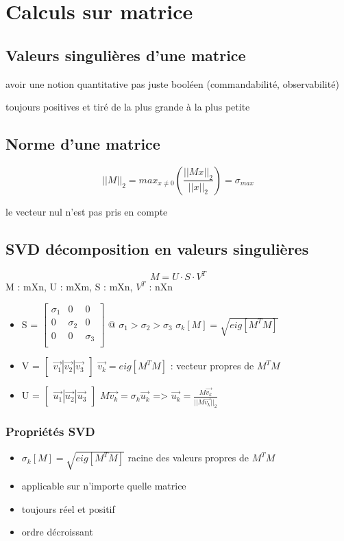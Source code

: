 \documentclass[resume]{subfiles}
\begin{document}
\section{Calculs sur matrice}

\subsection{Valeurs singulières d'une matrice}

avoir une notion quantitative pas juste booléen (commandabilité, observabilité)

toujours positives et tiré de la plus grande à la plus petite

\subsection{Norme d'une matrice}
$$||M||_2 = max_{x\neq0}(\frac{||Mx||_2}{||x||_2}) = \sigma_{max}$$

le vecteur nul n'est pas pris en compte

\subsection{SVD décomposition en valeurs singulières}
$$M = U\cdot S\cdot V^T$$
M : mXn, U : mXm, S : mXn, $V^T$ : nXn

\begin{itemize}
\item S = $\begin{bmatrix}\sigma_1 & 0& 0\\0&\sigma_2 & 0\\0&0&\sigma_3\\\end{bmatrix}$ @ $\sigma_1 > \sigma_2 > \sigma_3$ 
  \subitem $\sigma_k[M] = \sqrt{eig[M^TM]}$ 
\item V = $\begin{bmatrix}\vec{v_1}|\vec{v_2}|\vec{v_3}\end{bmatrix}$ 
  \subitem $\vec{v_k}= eig[M^TM]$ : vecteur propres de $M^T M$ 
\item U = $\begin{bmatrix}\vec{u_1}|\vec{u_2}|\vec{u_3}\end{bmatrix}$ 
  \subitem $M\vec{v_k} = \sigma_k\vec{u_k}$ => $\vec{u_k}=\frac{M\vec{v_k}}{||M\vec{v_k}||_2}$  
\end{itemize}

\subsubsection{Propriétés SVD}
\begin{itemize}
\item $\sigma_k[M] = \sqrt{eig[M^TM]}$ racine des valeurs propres de $M^TM$ 
\item applicable sur n'importe quelle matrice
\item toujours réel et positif
\item ordre décroissant
\end{itemize}
\end{document}
